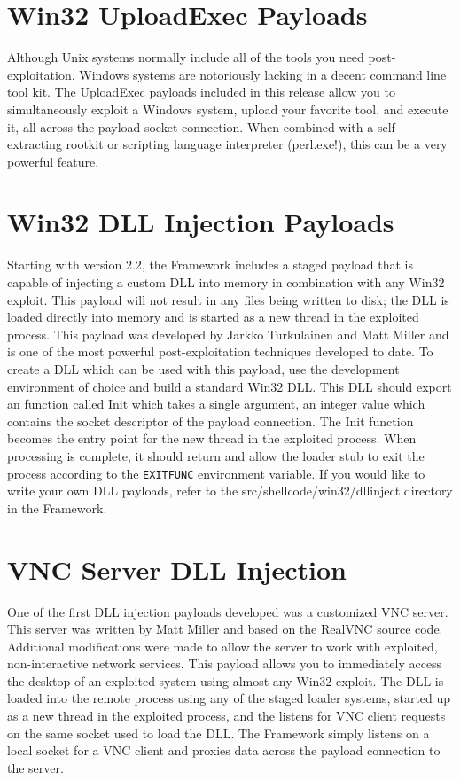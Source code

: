 \documentclass{report}
\begin{document}
\section{Win32 UploadExec Payloads}
\par
Although Unix systems normally include all of the tools you need
post-exploitation, Windows systems are notoriously lacking in a decent command
line tool kit. The UploadExec payloads included in this release allow you to
simultaneously exploit a Windows system, upload your favorite tool, and execute
it, all across the payload socket connection. When combined with a
self-extracting rootkit or scripting language interpreter (perl.exe!), this can
be a very powerful feature. 

\section{Win32 DLL Injection Payloads}
\par
Starting with version 2.2, the Framework includes a staged payload that is
capable of injecting a custom DLL into memory in combination with any Win32
exploit. This payload will not result in any files being written to disk; the
DLL is loaded directly into memory and is started as a new thread in the
exploited process. This payload was developed by Jarkko Turkulainen and Matt
Miller and is one of the most powerful post-exploitation techniques developed to
date. To create a DLL which can be used with this payload, use the development
environment of choice and build a standard Win32 DLL. This DLL should export an
function called Init which takes a single argument, an integer value which
contains the socket descriptor of the payload connection. The Init function
becomes the entry point for the new thread in the exploited process. When
processing is complete, it should return and allow the loader stub to exit the
process according to the \texttt{EXITFUNC} environment variable. If you would like to
write your own DLL payloads, refer to the src/shellcode/win32/dllinject
directory in the Framework. 

\section{VNC Server DLL Injection}
\par
One of the first DLL injection payloads developed was a customized VNC server.
This server was written by Matt Miller and based on the RealVNC source code.
Additional modifications were made to allow the server to work with exploited,
non-interactive network services. This payload allows you to immediately access
the desktop of an exploited system using almost any Win32 exploit. The DLL is
loaded into the remote process using any of the staged loader systems, started
up as a new thread in the exploited process, and the listens for VNC client
requests on the same socket used to load the DLL. The Framework simply listens
on a local socket for a VNC client and proxies data across the payload
connection to the server.  
\end{document}
